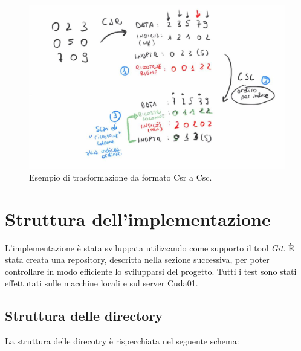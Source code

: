 \documentclass[]{IEEEtran}
\begin{document}
	\begin{figure}[h!]
		\includegraphics[scale=0.25]{figures/csr-to-csc.jpg}
		\caption{Esempio di trasformazione da formato Csr a Csc.}
	\end{figure}

	
\section{Struttura dell'implementazione} 
\label{struttura}
	L'implementazione è stata sviluppata utilizzando come supporto il tool \textit{Git}. È stata creata una repository, descritta nella sezione successiva, per poter controllare in modo efficiente lo svilupparsi del progetto. Tutti i test sono stati effettutati sulle macchine locali e sul server Cuda01.
	\newpage
	\subsection{Struttura delle directory}
	La struttura delle direcotry è rispecchiata nel seguente schema:
	\mbox{}
\end{document}
